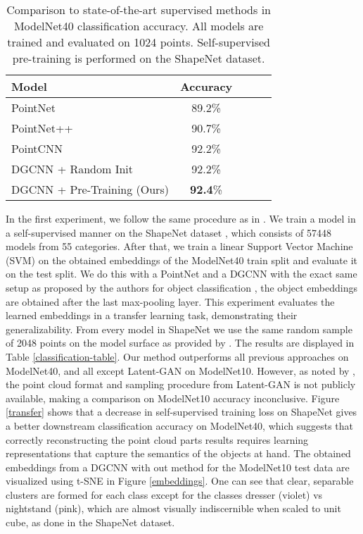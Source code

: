 \documentclass{article}
\begin{document}
\begin{table}[b]
\vskip -0.2in
\caption{Comparison to state-of-the-art supervised methods in ModelNet40 classification accuracy. All models are trained and evaluated on 1024 points. Self-supervised pre-training is performed on the ShapeNet dataset.}
\label{supervised}
\vskip -0.1in
\begin{center}
\begin{small}
\begin{tabular}{lcccr}
\toprule
Model & Accuracy \\
\midrule
PointNet \cite{pointnet}  & 89.2\%    \\
PointNet++ \cite{pointnet++} & 90.7\% \\
PointCNN \cite{pointcnn} & 92.2\% \\
DGCNN + Random Init \cite{dgcnn} & 92.2\% \\
DGCNN + Pre-Training (Ours) & \textbf{92.4}\% \\
\bottomrule
\end{tabular}
\end{small}
\end{center}
\end{table}

In the first experiment, we follow the same procedure as in \cite{latentgan, 3dgan, foldingnet, vipgan}. We train a model in a self-supervised manner on the ShapeNet dataset \cite{shapenet}, which consists of 57448 models from 55 categories. After that, we train a linear Support Vector Machine (SVM) \cite{svm} on the obtained embeddings of the ModelNet40 train split and evaluate it on the test split. We do this with a PointNet and a DGCNN with the exact same setup as proposed by the authors for object classification \cite{dgcnn, pointnet}, the object embeddings are obtained after the last max-pooling layer. This experiment evaluates the learned embeddings in a transfer learning task, demonstrating their generalizability. From every model in ShapeNet we use the same random sample of 2048 points on the model surface as provided by \cite{foldingnet}. The results are displayed in Table \ref{classification-table}. Our method outperforms all previous approaches on ModelNet40, and all except Latent-GAN on ModelNet10. However, as noted by \cite{foldingnet}, the point cloud format and sampling procedure from Latent-GAN is not publicly available, making a comparison on ModelNet10 accuracy inconclusive. Figure \ref{transfer} shows that a decrease in self-supervised training loss on ShapeNet gives a better downstream classification accuracy on ModelNet40, which suggests that correctly reconstructing the point cloud parts results requires learning representations that capture the semantics of the objects at hand. The obtained embeddings from a DGCNN with out method for the ModelNet10 test data are visualized using t-SNE \cite{tsne} in Figure \ref{embeddings}. One can see that clear, separable clusters are formed for each class except for the classes dresser (violet) vs nightstand (pink), which are almost visually indiscernible when scaled to unit cube, as done in the ShapeNet dataset. 
\end{document}
